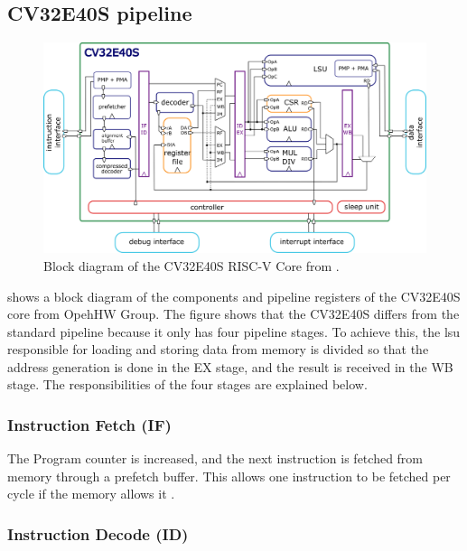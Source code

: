 \subsection{CV32E40S pipeline}
\label{sec:bg_cv32Pipeline}


\begin{figure}[htb]
    \centering
    \includegraphics[width=\linewidth]{figures/CV32E40S_Block_Diagram.png}
    \caption{Block diagram of the CV32E40S RISC-V Core from \cite{openhwgroupIntroductionCOREVCV32E40S2023}.}
    \label{fig:cv32e40s-block}
\end{figure}

 shows a block diagram of the components and pipeline registers of the CV32E40S core from OpehHW Group.
The figure shows that the CV32E40S differs from the standard pipeline because it only has four pipeline stages. To achieve this, the \acrlong{lsu} responsible for loading and storing data from memory is divided so that the address generation is done in the EX stage, and the result is received in the WB stage.
The responsibilities of the four stages are explained below.

\subsubsection{Instruction Fetch (IF)}

The Program counter is increased, and the next instruction is fetched from memory through a prefetch buffer. This allows one instruction to be fetched per cycle if the memory allows it \cite{openhwgroupPipelineDetailsCOREV2023}.

\subsubsection{Instruction Decode (ID)}


